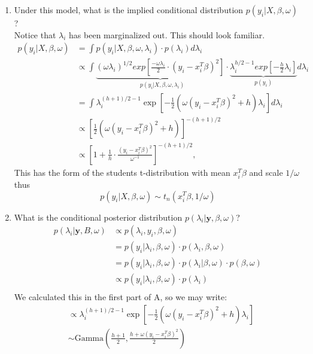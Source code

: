 \documentclass{homework}
\begin{document}
\begin{enumerate}[label=(\Alph*)]
\item Under this model, what is the implied conditional distribution $p(y_i | X, \beta, \omega)$? 
\\Notice that $\lambda_i$ has been marginalized out. This should look familiar.
\begin{equation} \begin{split}
p(y_i | X, \beta, \omega) &= \int p(y_i | X, \beta, \omega, \lambda_i) \cdot p(\lambda_i) d\lambda_i\\
&\propto \int \underbrace{ (\omega \lambda_i)^{1/2} exp\left[ \frac{-\omega \lambda_i}{2} \cdot (y_i - x_i^T\beta)^2 \right]}_\text{ $p(y_i | X, \beta, \omega, \lambda_i)$} \cdot \underbrace{\lambda_i^{h/2 -1 } exp[ -\frac{h}{2} \lambda_i ] }_\text{$p(y_i)$} d\lambda_i\\
&= \int \lambda_i^{(h+1)/2 - 1} \exp \left[ -\frac{1}{2} \left( \omega (y_i - x_i^T \beta)^2 + h \right) \lambda_i \right] d\lambda_i \\
&\propto \left[ \frac{1}{2} \left( \omega (y_i - x_i^T \beta)^2 + h \right) \right]^{-(h+1)/2} \\
&\propto \left[ 1 + \frac{1}{h} \cdot \frac{(y_i - x_i^T \beta)^2}{\omega^{-1}} \right]^{-(h+1)/2}, 
\end{split}\end{equation}
This has the form of the students t-distribution with mean $x_i^T\beta$ and scale $1/\omega$ thus \\ $$p(y_i | X, \beta, \omega) \sim t_n( x_i^T\beta, 1/\omega)$$


\item What is the conditional posterior distribution $p(\lambda_i | \textbf{y}, \beta, \omega)$?\\
\begin{equation} \begin{split}
p(\lambda_i | \textbf{y}, B, \omega) &\propto p(\lambda_i, y_i, \beta, \omega)\\
& = p(y_i | \lambda_i, \beta, \omega) \cdot p(\lambda_i, \beta, \omega) \\
& = p(y_i | \lambda_i, \beta, \omega) \cdot p(\lambda_i | \beta, \omega) \cdot p(\beta,\omega)\\
& \propto  p(y_i | \lambda_i, \beta, \omega) \cdot p(\lambda_i )\\
\end{split}\end{equation}
We calculated this in the first part of A, so we may write:
\begin{equation} \begin{split}
&\propto \lambda_i^{(h+1)/2 - 1} \exp \left[ -\frac{1}{2} \left( \omega (y_i - x_i^T \beta)^2 + h \right) \lambda_i \right] \\
&\sim \text{Gamma}\left( \frac{h+1}{2}, \frac{h + \omega (y_i - x_i^T \beta)^2}{2} \right)
\end{split}\end{equation}



\end{enumerate}
\end{document}
